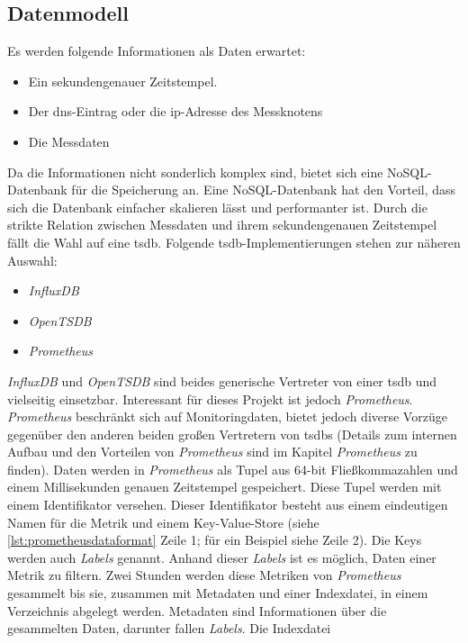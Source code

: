 \documentclass[titlepage]{report}
\begin{document}
\subsection*{Datenmodell}
Es werden folgende Informationen als Daten erwartet:
\begin{itemize}
    \item Ein sekundengenauer Zeitstempel.
    \item Der \gls{dns}\hyp{}Eintrag oder die
        \gls{ip}\hyp{}Adresse des Messknotens
    \item Die Messdaten
\end{itemize}
Da die Informationen nicht sonderlich komplex sind, bietet sich eine
NoSQL\hyp{}Datenbank für die Speicherung an. Eine NoSQL\hyp{}Datenbank
hat den Vorteil, dass sich die Datenbank einfacher skalieren lässt und
performanter ist. Durch die strikte Relation zwischen Messdaten und
ihrem sekundengenauen Zeitstempel fällt die Wahl auf eine \gls{tsdb}.
Folgende \gls{tsdb}\hyp{}Implementierungen stehen zur näheren Auswahl:
\begin{itemize}
    \item \emph{InfluxDB}\cite{INFLUXDB}
    \item \emph{OpenTSDB}\cite{OPENTSDB}
    \item \emph{Prometheus}\cite{PROMETHEUS}
\end{itemize}
\emph{InfluxDB} und \emph{OpenTSDB} sind beides generische Vertreter von
einer \gls{tsdb} und vielseitig einsetzbar. Interessant für dieses
Projekt ist jedoch \emph{Prometheus}. \emph{Prometheus} beschränkt sich
auf Monitoringdaten, bietet jedoch diverse Vorzüge gegenüber den anderen beiden
großen Vertretern von \glspl{tsdb} (Details zum internen Aufbau
und den Vorteilen von \emph{Prometheus} sind im Kapitel
\emph{Prometheus} zu finden). Daten werden in \emph{Prometheus} als
Tupel aus 64\hyp{}bit Fließkommazahlen und einem Millisekunden genauen
Zeitstempel gespeichert\cite{PROMETHEUS_DATA_MODEL}. Diese Tupel werden
mit einem Identifikator versehen. Dieser Identifikator besteht aus
einem eindeutigen Namen für die Metrik und einem
Key\hyp{}Value\hyp{}Store (siehe \autoref{lst:prometheusdataformat} Zeile 1; für ein
Beispiel siehe Zeile 2). Die Keys werden auch \emph{Labels} genannt.
Anhand dieser \emph{Labels} ist es möglich, Daten einer Metrik 
zu filtern. Zwei Stunden werden diese Metriken von \emph{Prometheus}
gesammelt bis sie, zusammen mit Metadaten und einer Indexdatei, in einem
Verzeichnis abgelegt werden. Metadaten sind Informationen über die
gesammelten Daten, darunter fallen \emph{Labels}. Die Indexdatei
\end{document}
